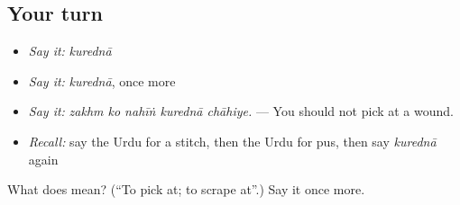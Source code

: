 \subsection*{Your turn}
\begin{itemize}
\raggedright
  \item \emph{Say it:} \emph{kurednā}
  \item \emph{Say it:} \emph{kurednā}, once more
  \item \emph{Say it:} \emph{zakhm ko nahīṅ kurednā chāhiye.} — You should not pick at a wound.
  \item \emph{Recall:} say the Urdu for a stitch, then the Urdu for pus, then say \emph{kurednā} again
\end{itemize}

\begin{tcolorbox}[breakable,colback=teal!4,colframe=teal!35!black,title={Before you move on}]
What does  mean? (\textquotedblleft{}To pick at; to scrape at\textquotedblright{}.) Say it once more.
\end{tcolorbox}
